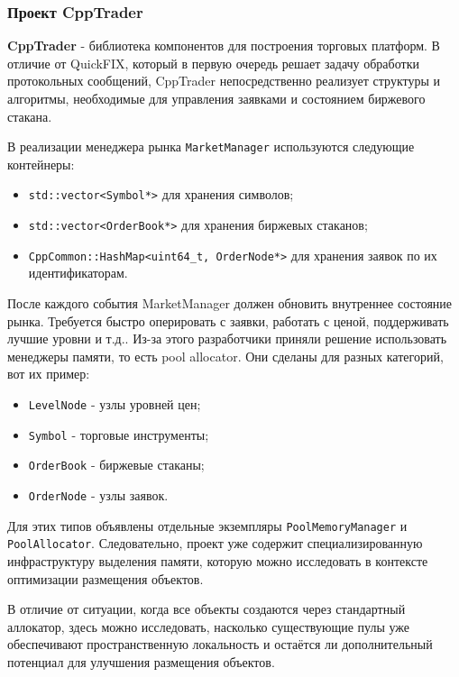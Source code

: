 \documentclass[a4paper,12pt]{article}
\begin{document}
\subsubsection{Проект CppTrader}

\textbf{CppTrader} - библиотека компонентов для построения торговых
платформ. В отличие от QuickFIX, который в первую очередь решает задачу обработки
протокольных сообщений, CppTrader непосредственно реализует структуры
и алгоритмы, необходимые для управления заявками и состоянием биржевого
стакана.

В реализации менеджера рынка \texttt{MarketManager} используются
следующие контейнеры:

\begin{itemize}
    \item \texttt{std::vector<Symbol*>} для хранения символов;
    \item \texttt{std::vector<OrderBook*>} для хранения биржевых стаканов;
    \item \texttt{CppCommon::HashMap<uint64\_t, OrderNode*>} для хранения
    заявок по их идентификаторам.
\end{itemize}

После каждого события MarketManager должен обновить внутреннее состояние рынка.
Требуется быстро оперировать с заявки, работать с ценой, поддерживать лучшие
уровни и т.д.. Из-за этого разработчики приняли решение использовать менеджеры
памяти, то есть pool allocator. Они сделаны для разных категорий, вот их пример:

\begin{itemize}
    \item \texttt{LevelNode} - узлы уровней цен;
    \item \texttt{Symbol} - торговые инструменты;
    \item \texttt{OrderBook} - биржевые стаканы;
    \item \texttt{OrderNode} - узлы заявок.
\end{itemize}

Для этих типов объявлены отдельные экземпляры
\texttt{PoolMemoryManager} и \texttt{PoolAllocator}.
Следовательно, проект уже содержит специализированную инфраструктуру
выделения памяти, которую можно исследовать в контексте оптимизации
размещения объектов.

В отличие от ситуации, когда все объекты создаются через стандартный
аллокатор, здесь можно исследовать, насколько существующие пулы уже
обеспечивают пространственную локальность и остаётся ли дополнительный
потенциал для улучшения размещения объектов.
\end{document}

